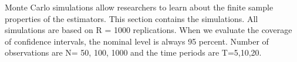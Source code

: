 Monte Carlo simulations allow researchers to learn about the finite sample properties of the estimators.
This section contains the simulations. All simulations are based on R = 1000 replications. When we evaluate the coverage of confidence intervals, the nominal level is always 95 percent. Number of observations are N= 50, 100, 1000 and the time periods are T=5,10,20.










